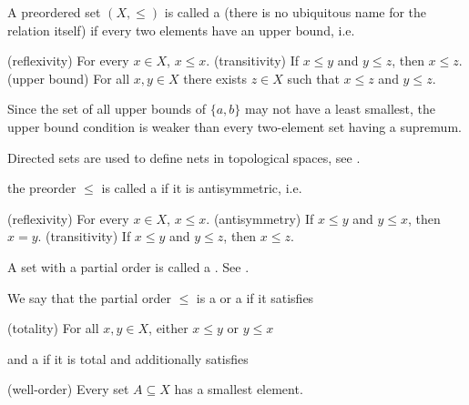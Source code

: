 \begin{definition}
\begin{defenum}
    \cite[8]{Engelking1989} A preordered set \( (X, \leq) \) is called a  (there is no ubiquitous name for the relation itself) if every two elements have an upper bound, i.e.
    \begin{defenum}
      (reflexivity) For every \( x \in X \), \( x \leq x \).
      (transitivity) If \( x \leq y \) and \( y \leq z \), then \( x \leq z \).
      (upper bound) For all \( x, y \in X \) there exists \( z \in X \) such that \( x \leq z \) and \( y \leq z \).
    \end{defenum}

    Since the set of all upper bounds of \( \{ a, b \} \) may not have a least smallest, the upper bound condition is weaker than every two-element set having a supremum.

    Directed sets are used to define nets in topological spaces, see .

    \cite[7]{Engelking1989} the preorder \( \leq \) is called a  if it is antisymmetric, i.e.
    \begin{defenum}[series=def:order/partial]
      (reflexivity) For every \( x \in X \), \( x \leq x \).
      (antisymmetry) If \( x \leq y \) and \( y \leq x \), then \( x = y \).
      (transitivity) If \( x \leq y \) and \( y \leq z \), then \( x \leq z \).
    \end{defenum}

    A set with a partial order is called a . See .

    We say that the partial order \( \leq \) is a  or a  if it satisfies
    \begin{defenum}[resume=def:order/partial]
      (totality) For all \( x, y \in X \), either \( x \leq y \) or \( y \leq x \)
    \end{defenum}
    and a  if it is total and additionally satisfies
    \begin{defenum}[resume=def:order/partial]
      (well-order) Every set \( A \subseteq X \) has a smallest element.
    \end{defenum}


\end{defenum}
\end{definition}
